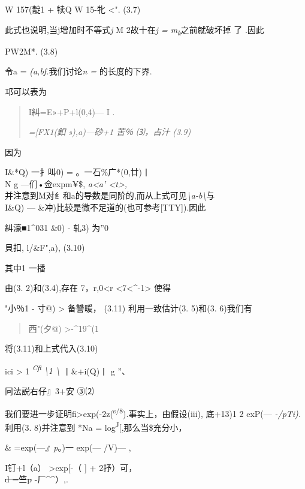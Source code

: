 \documentclass{article}
\begin{document}
W 157(靛1 + 犊Q W 15-牝 \textless{}". (3.7)

此式也说明,当j增加时不等式\emph{j} M 2故十在\emph{j =
m\textsubscript{k}}之前就破坏掉 了 .因此

PW2M*. (3.8)

令a = \emph{(a,bf.}我们讨论\emph{n =} 的长度的下界.

邛可以表为

\begin{quote}
I糾=\textbar{}E»+P+l(0,4)--- I .

\emph{={[}FX1(釦 s),a)---砂+1 苦％ ⑶，占汁 (3.9)}
\end{quote}

因为

I\&*Q) 一扌叫0)\textbar{} =
\textbar{}。一石\textbar{}\textbar{}\%广*(0,廿)丨\\
N g ---们•佥expm¥\$, \emph{a\textless{}a' \textless{}t\textgreater{},\\
}并注意到M对纟和a的导数是同阶的,而从上式可见\emph{\textbackslash{}a-b\textbackslash{}}与\\
I\&Q) --- \&冲)\textbar{}比较是微不足道的(也可参考{[}TTY{]}).因此

\textbar{}糾濠■1\^{}031 \textbar{}\&0) - 轧3)\textbar{} \textbar{}为''0
\textbar{}

貝扣, l/\&F",a)\textbar{}, (3.10)

其中1 一播

由(3. 2)和(3.4),存在 7，r,0\textless{}r
\textless{}7\textless{}\^{}-1\textgreater{} 使得

"\textbar{}小％1 - 寸@) \textbar{} \textgreater{} 备讐暖， (3.11)
利用一致估计(3. 5)和(3. 6)我们有

\begin{quote}
\textbar{}西"(夕@)\textbar{} \textgreater{}-\^{}19\^{}(1
\end{quote}

将(3.11)和上式代入(3.10)

ici \textgreater{} 1 \emph{\textsuperscript{Cfi} \textbackslash{}1
\textbackslash{}} {丨\&+i(Q)丨} g ''、

冋法説右仔』3+安 ③⑵

我们要进一步证明\textbar{}fi\textbar{}\textgreater{}exp(-2z(\textsuperscript{s/8}).事实上，由假设(iii),
底+13)1 2 exP(--- \emph{-/pTi).}利用(3. 8)并注意到 *Na =
log\textsuperscript{J}{[}\textbar{}{]},那么当\$充分小，

\&\textbar{} =exp(---\emph{』p}。)一 exp(--- /V)--- ,

I钉+l（a）\textbar{} \textgreater{}exp{[}-（ {]} + 2抒）可，\\
\sout{d =竺p} -厂\^{}\^{}）,.
\end{document}
